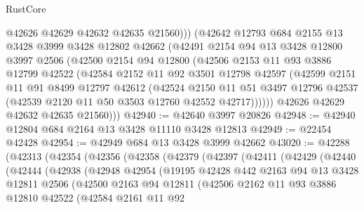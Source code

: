 \begin{lexlean}{RustCore}
\begin{coremodule}
            @42626
            @42629
            @42632
            @42635
            @21560)))
      (@42642
        @12793
        @684
        @2155
        @13
        @3428
        @3999
        @3428
        @12802
        @42662
        (@42491
          @2154
          @94
          @13
          @3428
          @12800
          @3997
          @2506
          (@42500
            @2154
            @94
            @12800
            (@42506
              @2153
              @11
              @93
              @3886
              @12799
              @42522
              (@42584
                @2152
                @11
                @92
                @3501
                @12798
                @42597
                (@42599
                  @2151
                  @11
                  @91
                  @8499
                  @12797
                  @42612
                  (@42524
                    @2150
                    @11
                    @51
                    @3497
                    @12796
                    @42537
                    (@42539 @2120 @11 @50 @3503 @12760 @42552 @42717))))))
          @42626
          @42629
          @42632
          @42635
          @21560)))
@42940 := @42640 @3997 @20826
@42948 := @42940 @12804 @684 @2164 @13 @3428 @11110 @3428 @12813
@42949 := @22454 @42428
@42954 := @42949 @684 @13 @3428 @3999 @42662
@43020 := @42288
    (@42313
      (@42354
        (@42356
          (@42358
            (@42379
              (@42397
                (@42411
                  (@42429
                    (@42440
                      (@42444
                        (@42938
                          (@42948
                            @42954
                            (@19195
                              @42428
                              @442
                              @2163
                              @94
                              @13
                              @3428
                              @12811
                              @2506
                              (@42500
                                @2163
                                @94
                                @12811
                                (@42506
                                  @2162
                                  @11
                                  @93
                                  @3886
                                  @12810
                                  @42522
                                  (@42584
                                    @2161
                                    @11
                                    @92

\end{coremodule}
\end{lexlean}
